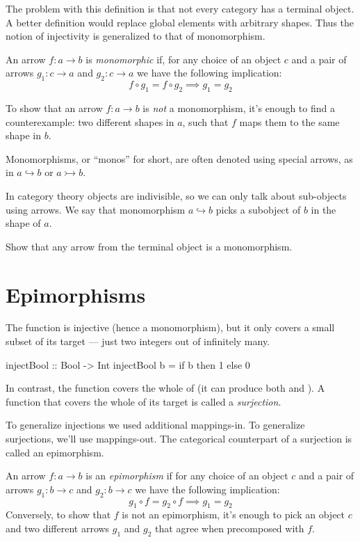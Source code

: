 \documentclass[DaoFP]{subfiles}
\begin{document}
The problem with this definition is that not every category has a terminal object. A better definition would replace global elements with arbitrary shapes. Thus the notion of injectivity is generalized to that of monomorphism. 

An arrow $f \colon a \to b$ is  \emph{monomorphic} if, for any choice of an object $c$ and a pair of arrows $g_1 \colon c \to a$ and $g_2 \colon c \to a$ we have the following implication:
\[ f \circ g_1 = f \circ g_2 \implies g_1 = g_2 \]

To show that an arrow $f \colon a \to b$ is \emph{not} a monomorphism, it's enough to find a counterexample: two different shapes in $a$, such that $f$ maps them to the same shape in $b$. 

Monomorphisms, or ``monos'' for short, are often denoted using special arrows, as in $a \hookrightarrow b$ or $a \rightarrowtail b$. 

In category theory objects are indivisible, so we can only talk about sub-objects using arrows. We say that monomorphism $a \hookrightarrow b$ picks a subobject of $b$ in the shape of $a$.

\begin{exercise}
Show that any arrow from the terminal object is a monomorphism.
\end{exercise}

\section{Epimorphisms}

The function  is injective (hence a monomorphism), but it only covers a small subset of its target --- just two integers out of infinitely many.
\begin{haskell}
injectBool :: Bool -> Int
injectBool b = if b then 1 else 0
\end{haskell}
In contrast, the function  covers the whole of  (it can produce both  and ). A function that covers the whole of its target is called a \emph{surjection}.

To generalize injections we used additional mappings-in. To generalize surjections, we'll use mappings-out. The categorical counterpart of a surjection is called an epimorphism.

An arrow $f \colon a \to b$ is an \emph{epimorphism} if for any choice of an object $c$ and a pair of arrows $g_1 \colon b \to c$ and $g_2 \colon b \to c$ we have the following implication:
\[ g_1 \circ f = g_2 \circ f \implies g_1 = g_2 \]
Conversely, to show that $f$ is not an epimorphism, it's enough to pick an object $c$ and two different arrows $g_1$ and $g_2$ that agree when precomposed with $f$.
\end{document}
